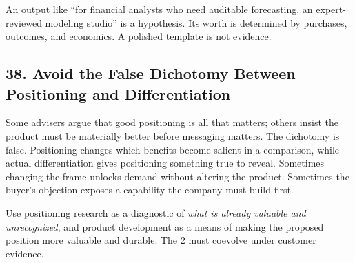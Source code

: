 An output like ``for financial analysts who need auditable forecasting, an expert-reviewed modeling studio'' is a hypothesis. Its worth is determined by purchases, outcomes, and economics. A polished template is not evidence.

\subsection*{38. Avoid the False Dichotomy Between Positioning and Differentiation}

Some advisers argue that good positioning is all that matters; others insist the product must be materially better before messaging matters. The dichotomy is false. Positioning changes which benefits become salient in a comparison, while actual differentiation gives positioning something true to reveal. Sometimes changing the frame unlocks demand without altering the product. Sometimes the buyer's objection exposes a capability the company must build first.

Use positioning research as a diagnostic of \emph{what is already valuable and unrecognized}, and product development as a means of making the proposed position more valuable and durable. The 2 must coevolve under customer evidence.
